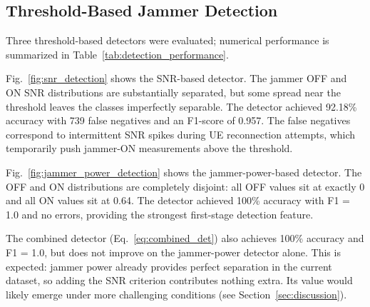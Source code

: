 \documentclass[conference]{IEEEtran}
\begin{document}
\subsection{Threshold-Based Jammer Detection}

Three threshold-based detectors were evaluated; numerical performance is
summarized in Table~\ref{tab:detection_performance}.


\begin{table}[htbp]
\centering
\caption{Performance of threshold-based jammer detectors.}
\label{tab:detection_performance}
\end{table}

Fig.~\ref{fig:snr_detection} shows the SNR-based detector. The jammer
OFF and ON SNR distributions are substantially separated, but some spread
near the threshold leaves the classes imperfectly separable. The detector
achieved 92.18\% accuracy with 739 false negatives and an F1-score of
0.957. The false negatives correspond to intermittent SNR spikes during
UE reconnection attempts, which temporarily push jammer-ON measurements
above the threshold.

Fig.~\ref{fig:jammer_power_detection} shows the jammer-power-based
detector. The OFF and ON distributions are completely disjoint: all OFF
values sit at exactly 0 and all ON values sit at 0.64. The detector
achieved 100\% accuracy with F1 = 1.0 and no errors, providing the
strongest first-stage detection feature.

The combined detector (Eq.~\eqref{eq:combined_det}) also achieves 100\%
accuracy and F1 = 1.0, but does not improve on the jammer-power detector
alone. This is expected: jammer power already provides perfect separation
in the current dataset, so adding the SNR criterion contributes nothing
extra. Its value would likely emerge under more challenging conditions
(see Section~\ref{sec:discussion}).
\end{document}
